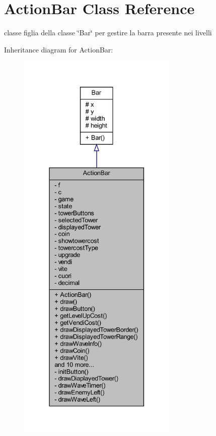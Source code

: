 \hypertarget{classui_1_1_action_bar}{}\section{Action\+Bar Class Reference}
\label{classui_1_1_action_bar}


classe figlia della classe \char`\"{}\+Bar\char`\"{} per gestire la barra presente nei livelli  




Inheritance diagram for Action\+Bar\+:
\nopagebreak
\begin{figure}[H]
\begin{center}
\leavevmode
\includegraphics[height=550pt]{classui_1_1_action_bar__inherit__graph}
\end{center}
\end{figure}


